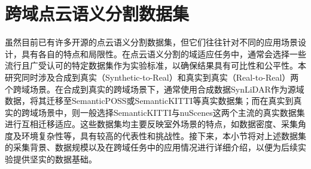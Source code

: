 \section{跨域点云语义分割数据集}
虽然目前已有许多开源的点云语义分割数据集，但它们往往针对不同的应用场景设计，具有各自的特点和局限性。在点云语义分割的域适应任务中，通常会选择一些流行且广受认可的特定数据集作为实验标准，以确保结果具有可比性和公平性。本研究同时涉及合成到真实（Synthetic-to-Real）和真实到真实（Real-to-Real）两个跨域场景。在合成到真实的跨域场景下，通常使用合成数据SynLiDAR作为源域数据，将其迁移至SemanticPOSS或SemanticKITTI等真实数据集；而在真实到真实的跨域场景中，则一般选择SemanticKITTI与nuScenes这两个主流的真实数据集进行互相迁移适应。这些数据集均主要反映室外场景的特点，如数据密度、采集角度及环境复杂性等，具有较高的代表性和挑战性。接下来，本小节将对上述数据集的采集背景、数据规模以及在跨域任务中的应用情况进行详细介绍，以便为后续实验提供坚实的数据基础。
